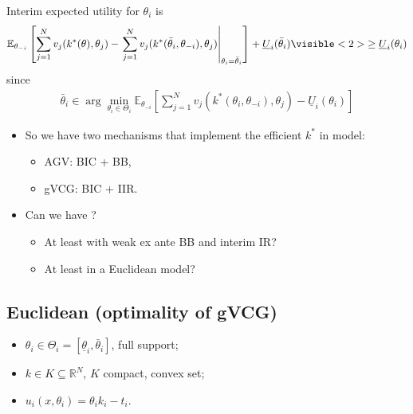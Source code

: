 \documentclass[english]{beamer}		%
\def\lyxframeend{} %
\begin{document}
Interim expected utility for $\theta_i$ is
{\small
	\begin{align*}
		\mathbb{E}_{\theta_{-i}} \left[ \sum_{j =1}^N v_j (k^*(\theta),\theta_j) - \left. \sum_{j =1}^N v_j (k^*(\bar{\theta}_i,\theta_{-i}),\theta_j) \right|_{\theta_i = \bar{\theta}_i} \right] + \underline{U}_i (\bar{\theta}_i)
		\visible<2>{
			\geq \underline{U}_i(\theta_i)
		}
	\end{align*}
}
\pause
since
\begin{align*}
	\bar{\theta}_i \in \arg \min_{\theta_i \in \Theta_i} \mathbb{E}_{\theta_{-i}} \left[ \sum_{j=1}^{N} v_j (k^*(\theta_i,\theta_{-i}),\theta_j) - \underline{U}_i (\theta_i) \right]
\end{align*}
\lyxframeend


\begin{itemize}
	\item So we have two mechanisms that implement the efficient $k^*$ in  model:
	\begin{itemize}
		\item AGV: BIC + BB,
		\item gVCG: BIC + IIR.
	\end{itemize}
	\pause
	\item Can we have ? 
	\begin{itemize}
		\item At least with weak ex ante BB and interim IR?
		\item At least in a \alert{Euclidean} model?
	\end{itemize}
\end{itemize}
\lyxframeend


\subsection{Euclidean (optimality of gVCG)}

\begin{itemize}
	\item $\theta_i \in \Theta_{i} = [\underline{\theta}_i, \bar{\theta}_i]$, full support;
	\item $k \in K \subseteq \mathbb{R}^N$, $K$ compact, convex set;
	\item $u_i(x,\theta_i) = \theta_i k_i - t_i$.
\end{itemize}
\lyxframeend
\end{document}
